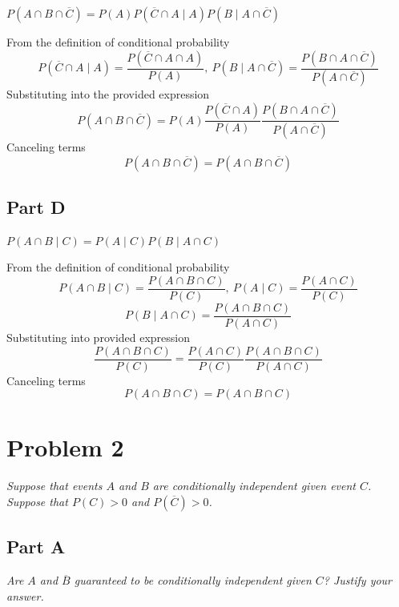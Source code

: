 \documentclass{article}
\begin{document}
\textit{$ P \left( A \cap B \cap \overline{C} \right) = P \left( A \right) P
\left( \overline{C} \cap A \mid A \right) P \left( B \mid A \cap \overline{C}
\right) $}

\bigbreak

From the definition of conditional probability
$$ P ( \overline{C} \cap A \mid A ) = \frac{ P ( \overline{C} \cap A \cap A ) }{
    P ( A ) },\ P ( B \mid A \cap \overline{C} ) = \frac{ P ( B \cap A \cap
\overline{C} ) }{ P ( A \cap \overline{C} ) } $$
Substituting into the provided expression
$$ P ( A \cap B \cap \overline{C} ) = P ( A ) \frac{ P ( \overline{C} \cap A )
}{ P ( A ) } \frac{ P ( B \cap A \cap \overline{C} ) }{ P ( A \cap \overline{C}
) } $$
Canceling terms
$$ P ( A \cap B \cap \overline{C} ) =  P ( A \cap B \cap \overline{C} ) $$

\subsection*{Part D}

\textit{$ P \left( A \cap B \mid C \right) = P \left( A \mid C \right) P \left(
B \mid A \cap C \right) $}

\bigbreak

From the definition of conditional probability
$$ P ( A \cap B \mid C ) = \frac{ P ( A \cap B \cap C ) }{ P ( C ) },\ P ( A
\mid C ) = \frac{ P ( A \cap C ) }{ P ( C ) } $$
$$ P ( B \mid A \cap C ) = \frac{ P ( A \cap B \cap C ) }{ P ( A \cap C ) } $$
Substituting into provided expression
$$ \frac{ P ( A \cap B \cap C ) }{ P ( C ) } = \frac{ P ( A \cap C ) }{ P ( C )
} \frac{ P ( A \cap B \cap C ) }{ P ( A \cap C ) } $$
Canceling terms
$$ P ( A \cap B \cap C ) =  P ( A \cap B \cap C ) $$

\section*{Problem 2}

\textit{Suppose that events $ A $ and $ B $ are conditionally independent given
event $ C $. Suppose that $ P \left( C \right) > 0 $ and $ P \left( \overline{C}
\right) > 0 $.}

\subsection*{Part A}

\textit{Are $ A $ and $ \overline{B} $ guaranteed to be conditionally
independent given $ C $? Justify your answer.}
\end{document}
